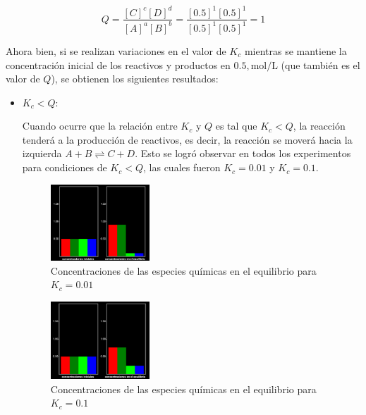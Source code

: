 \documentclass[10pt]{article}
\begin{document}
\begin{multicols*}{2}
        \begin{equation}
            Q = \frac{[C]^c[D]^d}{[A]^a[B]^b} = \frac{[0.5]^1[0.5]^1}{[0.5]^1[0.5]^1} = 1
        \end{equation}

        Ahora bien, si se realizan variaciones en el valor de $K_c$ mientras se mantiene la concentración inicial de los reactivos y productos en $0.5 , \text{mol/L}$ (que también es el valor de $Q$), se obtienen los siguientes resultados:

        \begin{itemize}
            \item $K_c < Q$:
            
                Cuando ocurre que la relación entre $K_c$ y $Q$ es tal que $K_c < Q$, la reacción tenderá a la producción de reactivos, es decir, la reacción se moverá hacia la izquierda $A + B \rightleftharpoons C + D$. Esto se logró observar en todos los experimentos para condiciones de $K_c < Q$, las cuales fueron $K_c = 0.01$ y $K_c = 0.1$.

                \begin{figure}[H]
                    \centering
                    \includegraphics[width=0.35\textwidth]{img/lab001.png}
                    \caption{Concentraciones de las especies químicas en el equilibrio para $K_c = 0.01$}
                \end{figure}

                \begin{figure}[H]
                    \centering
                    \includegraphics[width=0.35\textwidth]{img/lab01.png}
                    \caption{Concentraciones de las especies químicas en el equilibrio para $K_c = 0.1$}
                \end{figure}


\end{itemize}
\end{multicols*}
\end{document}
